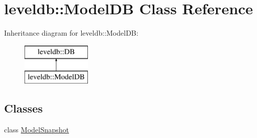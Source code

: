 \hypertarget{classleveldb_1_1_model_d_b}{}\section{leveldb\+:\+:Model\+DB Class Reference}
\label{classleveldb_1_1_model_d_b}
Inheritance diagram for leveldb\+:\+:Model\+DB\+:\begin{figure}[H]
\begin{center}
\leavevmode
\includegraphics[height=2.000000cm]{classleveldb_1_1_model_d_b}
\end{center}
\end{figure}
\subsection*{Classes}
\begin{DoxyCompactItemize}
\item 
class \mbox{\hyperlink{classleveldb_1_1_model_d_b_1_1_model_snapshot}{Model\+Snapshot}}
\end{DoxyCompactItemize}
